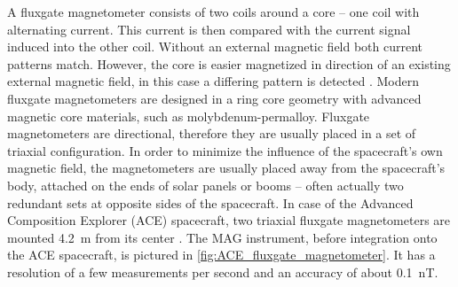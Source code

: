 A fluxgate magnetometer consists of two coils around a core -- one coil with alternating current. This current is then compared with the current signal induced into the other coil. Without an external magnetic field both current patterns match. However, the core is easier magnetized in direction of an existing external magnetic field, in this case a differing pattern is detected \citep{Ness1970}. Modern fluxgate magnetometers are designed in a ring core geometry with advanced magnetic core materials, such as molybdenum-permalloy.
Fluxgate magnetometers are directional, therefore they are usually placed in a set of triaxial configuration. In order to minimize the influence of the spacecraft's own magnetic field, the magnetometers are usually placed away from the spacecraft's body, attached on the ends of solar panels or booms -- often actually two redundant sets at opposite sides of the spacecraft.
In case of the Advanced Composition Explorer (ACE) spacecraft, two triaxial fluxgate magnetometers are mounted \SI{4.2}{\meter} from its center \citep{Smith1998}. The MAG instrument, before integration onto the ACE spacecraft, is pictured in \autoref{fig:ACE_fluxgate_magnetometer}. It has a resolution of a few measurements per second and an accuracy of about \SI{0.1}{\nano\tesla}.
\begin{figure}[htb]
\end{figure}

